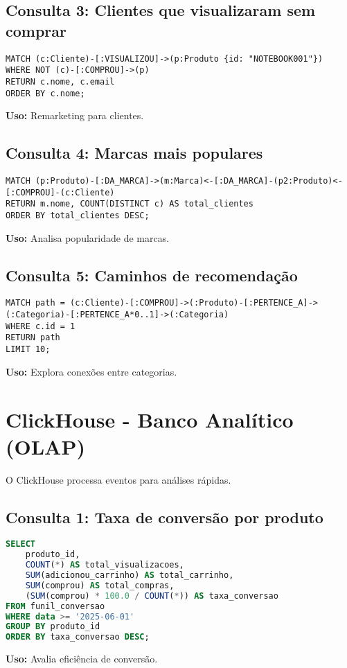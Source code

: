 \documentclass[a4paper,12pt]{article}
\begin{document}
\subsection{Consulta 3: Clientes que visualizaram sem comprar}
\begin{lstlisting}[language=Cypher]
MATCH (c:Cliente)-[:VISUALIZOU]->(p:Produto {id: "NOTEBOOK001"})
WHERE NOT (c)-[:COMPROU]->(p)
RETURN c.nome, c.email
ORDER BY c.nome;
\end{lstlisting}
\textbf{Uso:} Remarketing para clientes.

\subsection{Consulta 4: Marcas mais populares}
\begin{lstlisting}[language=Cypher]
MATCH (p:Produto)-[:DA_MARCA]->(m:Marca)<-[:DA_MARCA]-(p2:Produto)<-[:COMPROU]-(c:Cliente)
RETURN m.nome, COUNT(DISTINCT c) AS total_clientes
ORDER BY total_clientes DESC;
\end{lstlisting}
\textbf{Uso:} Analisa popularidade de marcas.

\subsection{Consulta 5: Caminhos de recomendação}
\begin{lstlisting}[language=Cypher]
MATCH path = (c:Cliente)-[:COMPROU]->(:Produto)-[:PERTENCE_A]->(:Categoria)-[:PERTENCE_A*0..1]->(:Categoria)
WHERE c.id = 1
RETURN path
LIMIT 10;
\end{lstlisting}
\textbf{Uso:} Explora conexões entre categorias.

\section{ClickHouse - Banco Analítico (OLAP)}
O ClickHouse processa eventos para análises rápidas.

\subsection{Consulta 1: Taxa de conversão por produto}
\begin{lstlisting}[language=SQL]
SELECT 
    produto_id,
    COUNT(*) AS total_visualizacoes,
    SUM(adicionou_carrinho) AS total_carrinho,
    SUM(comprou) AS total_compras,
    (SUM(comprou) * 100.0 / COUNT(*)) AS taxa_conversao
FROM funil_conversao
WHERE data >= '2025-06-01'
GROUP BY produto_id
ORDER BY taxa_conversao DESC;
\end{lstlisting}
\textbf{Uso:} Avalia eficiência de conversão.
\end{document}
